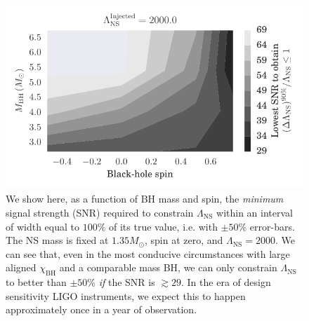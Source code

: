 \documentclass[aps,prd,amsmath,floats,floatfix, twocolumn,
superscriptaddress,nofootinbib,showpacs]{revtex4-1}
\newcommand{\lambdans}{\Lambda_\mathrm{NS}}
\newcommand{\chibh}{\chi_\mathrm{BH}}
\begin{document}
% 
\begin{figure}
\centering    
\includegraphics[width=\columnwidth]{plots/TTSNRThresholdFor100LambdaMeasurement_BHspin_BHmass_Lambda2000_0_CI90_0}
\caption{
We show here, as a function of BH mass and spin, the {\it minimum} signal
strength (SNR) required to constrain $\lambdans$ within an interval of width
equal to $100\%$ of its true value, i.e. with $\pm 50\%$ error-bars. The NS mass
is fixed at $1.35M_\odot$, spin at zero, and $\lambdans=2000$.
% 
We can see that, even in the most conducive circumstances with large aligned 
$\chibh$ and a comparable mass BH, we can only constrain $\lambdans$ to better
than $\pm 50\%$ {\it if} the SNR is $\gtrsim 29$. In the era of design
sensitivity LIGO instruments, we expect this to happen approximately once in a
year of observation.
% 
% 
}
\label{fig:TT_SNRThresholds_BHspin_BHmass_CI90_0}
\end{figure}
%
\end{document}
